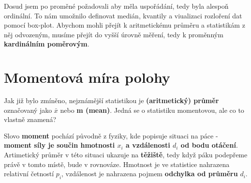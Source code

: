 \documentclass[
  czech,
  11pt,
  letterpaper,
  DIV=11,
  numbers=noendperiod]{scrreprt}
\begin{document}
Dosud jsem po proměné požadovali aby měla uspořádání, tedy byla alespoň
ordinální. To nám umožnilo definovat medián, kvantily a viualizaci
rozloření dat pomocí box-plot. Abychom mohli přejít k aritmetickému
průměru a statistikám z něj odvozeným, musíme přejít do vyšší úrovně
měření, tedy k proměnným \textbf{kardinálním poměrovým}.

\section{Momentová míra polohy}\label{momentovuxe1-muxedra-polohy}

Jak již bylo zmíněno, nejznámější statistikou je \textbf{(aritmetický)
průměr} označovaný jako \textbf{\(\bar{x}\)} nebo \textbf{m (mean)}.
Jedná se o statistiku momentovou, ale co to vlastně znamená?

Slovo \textbf{moment} pochází původně z fyziky, kde popisuje situaci na
páce - \textbf{moment síly je součin hmotnosti \(x_i\) a vzdálenosti
\(d_i\) od bodu otáčení}. Artimetický průměr v této situaci ukazuje na
\textbf{těžiště}, tedy když páku podepřeme právě v tomto místě, bude v
rovnováze. Hmotnost je ve statistice nahrazena relativní četností
\(p_i\), vzdálenost je nahrazena pojmem \textbf{odchylka od průměru}
\(d_i\).
\end{document}
